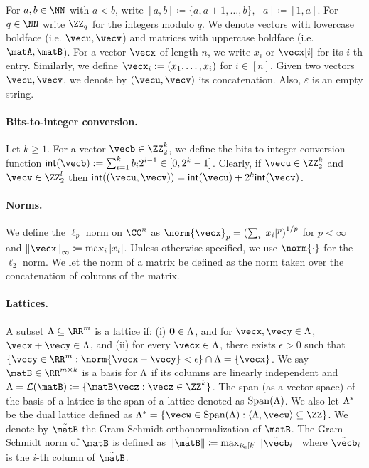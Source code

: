 \documentclass[11pt,letterpaper]{article}
\theoremstyle{definition} %
\begin{document}
For $a, b \in \NN$ with $a < b$, write $[a, b] \coloneqq \{ a, a+1, \dots, b \}, [a] \coloneqq [1, a]$.
For $q \in \NN$ write $\ZZ_q$ for the integers modulo $q$.
We denote vectors with lowercase boldface (i.e. $\vecu, \vecv$) and matrices with uppercase boldface (i.e. $\matA, \matB$). For a vector $\vecx$ of length $n$, we write $x_i$ or $\vecx[i]$ for its $i$-th entry. Similarly, we define $\vecx_i := (x_1,\ldots,x_i)$ for $i\in [n]$. Given two vectors $\vecu,\vecv$, we denote by $(\vecu,\vecv)$ its concatenation. Also, $\varepsilon$ is an empty string.

\paragraph{Bits-to-integer conversion.} Let $k \geq 1$. For a vector $\vecb \in \ZZ^k_2$, we define the bits-to-integer conversion function $\integer(\vecb) := \sum^k_{i=1} b_i2^{i-1} \in [0,2^k-1]$. Clearly, if $\vecu \in \ZZ^k_2$ and $\vecv \in \ZZ^{l}_2$ then $\integer((\vecu,\vecv)) = \integer(\vecu) + 2^k\integer(\vecv)$.

\paragraph{Norms.}
We define the $\ell_p$ norm on $\CC^n$ as $\norm{\vecx}_p = \left(\sum_i |x_i|^p\right)^{1/p}$ for $p < \infty$ and $\infnorm{\vecx} \coloneqq \max_i |x_i|$. Unless otherwise specified, we use $\norm{\cdot}$ for the $\ell_2$ norm. We let the norm of a matrix be defined as the norm taken over the concatenation of columns of the matrix.

\paragraph{Lattices.} A subset $\Lattice \subseteq \RR^m$ is a lattice if: (i) $\mathbf{0} \in \Lambda$, and for $\vecx, \vecy \in \Lattice$, $\vecx + \vecy \in \Lattice$, and (ii) for every $\vecx \in \Lattice$, there exists $\epsilon > 0$ such that $\{ \vecy \in \RR^m : \norm{\vecx - \vecy} < \epsilon \} \cap \Lattice = \{ \vecx \}$.
We say $\matB \in \RR^{m \times k}$ is a basis for $\Lambda$ if its columns are linearly independent and $\Lattice = \genLattice(\matB) \coloneqq \{ \matB \vecz : \vecz \in \ZZ^k \}$. The span (as a vector space) of the basis of a lattice is the span of a lattice denoted as $\mathrm{Span}(\Lambda)$.
We also let $\Lambda^*$ be the dual lattice defined as $\Lattice^* = \{ \vecw \in \Span(\Lattice) :  \langle \Lattice, \vecw \rangle \subseteq \ZZ \}$.
We denote by $\tilde{\matB}$ the Gram-Schmidt orthonormalization of $\matB$. The Gram-Schmidt norm of $\matB$ is defined as $
 \|\tilde{\matB} \| \coloneqq  \max_{i \in [k]} \| \tilde{\vecb}_i\| $
where $\tilde{\vecb}_i$ is the $i$-th column of $\tilde{\matB}$.
\end{document}
